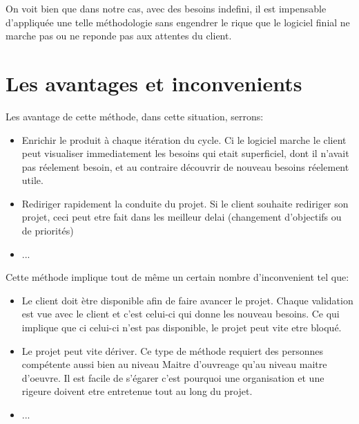 On voit bien que dans notre cas, avec des besoins indefini, il est impensable d'appliquée une telle méthodologie sans engendrer le rique que le logiciel finial ne marche pas ou ne reponde pas aux attentes du client.

\section{Les avantages et inconvenients}
Les avantage de cette méthode, dans cette situation, serrons:
\begin{itemize}
    \item Enrichir le produit à chaque itération du cycle. Ci le logiciel marche le client peut visualiser immediatement les besoins qui etait superficiel, dont il n'avait pas réelement besoin, et au contraire découvrir de nouveau besoins réelement utile.
    \item Rediriger rapidement la conduite du projet. Si le client souhaite rediriger son projet, ceci peut etre fait dans les meilleur delai (changement d'objectifs ou de priorités)
    \item ...
\end{itemize}

Cette méthode implique tout de même un certain nombre d'inconvenient tel que:
\begin{itemize}
    \item Le client doit ètre disponible afin de faire avancer le projet. Chaque validation est vue avec le client et c'est celui-ci qui donne les nouveau besoins. Ce qui implique que ci celui-ci n'est pas disponible, le projet peut vite etre bloqué.
    \item Le projet peut vite dériver. Ce type de méthode requiert des personnes compétente aussi bien au niveau Maitre d'ouvreage qu'au niveau maitre d'oeuvre. Il est facile de s'égarer c'est pourquoi une organisation et une rigeure doivent etre entretenue tout au long du projet.
    \item ...
\end{itemize}







    
